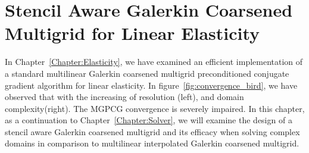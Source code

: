 \chapter{Stencil Aware Galerkin Coarsened Multigrid for Linear Elasticity} 
\label{Chapter:BBMG}
In Chapter~\ref{Chapter:Elasticity}, we have examined an efficient implementation of a standard multilinear Galerkin coarsened multigrid preconditioned conjugate gradient algorithm for linear elasticity. In figure~\ref{fig:convergence_bird}, we have observed that with the increasing of resolution (left), and domain complexity(right). The MGPCG convergence is severely impaired. In this chapter, as a continuation to  Chapter~\ref{Chapter:Solver}, we will examine the design of a stencil aware Galerkin coarsened multigrid and its efficacy when solving complex domains in comparison to multilinear interpolated Galerkin coarsened multigrid.


